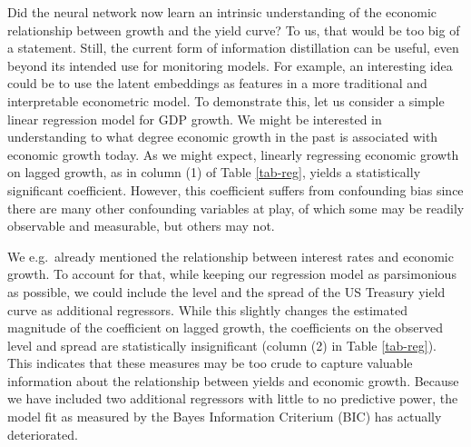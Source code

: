\documentclass{article}
\theoremstyle{plain}
\theoremstyle{definition}
\theoremstyle{remark}
\begin{document}
Did the neural network now learn an intrinsic understanding of the economic relationship between growth and the yield curve? To us, that would be too big of a statement. Still, the current form of information distillation can be useful, even beyond its intended use for monitoring models.
For example, an interesting idea could be to use the latent embeddings as features in a more traditional and interpretable econometric model. To demonstrate this, let us consider a simple linear regression model for GDP growth. We might be interested in understanding to what degree economic growth in the past is associated with economic growth today. As we might expect, linearly regressing economic growth on lagged growth, as in column (1) of Table \ref{tab-reg}, yields a statistically significant coefficient. However, this coefficient suffers from confounding bias since there are many other confounding variables at play, of which some may be readily observable and measurable, but others may not.


We e.g.\ already mentioned the relationship between interest rates and economic growth. To account for that, while keeping our regression model as parsimonious as possible, we could include the level and the spread of the US Treasury yield curve as additional regressors. While this slightly changes the estimated magnitude of the coefficient on lagged growth, the coefficients on the observed level and spread are statistically insignificant (column (2) in Table \ref{tab-reg}). This indicates that these measures may be too crude to capture valuable information about the relationship between yields and economic growth. Because we have included two additional regressors with little to no predictive power, the model fit as measured by the Bayes Information Criterium (BIC) has actually deteriorated.
\end{document}
